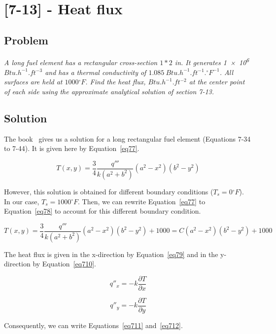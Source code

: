 \section{[7-13] - Heat flux}
\label{prob72}

\subsection{Problem}
\textit{A long fuel element has a rectangular cross-section $1*2$ in. It generates \num{1e6} $Btu.h^{-1}.ft^{-3}$ and has a thermal conductivity of $1.085\ Btu.h^{-1}.ft^{-1}.{}^\circ F^{-1}$. All surfaces are held at $1000{}^\circ F$. Find the heat flux, $Btu.h^{-1}.ft^{-2}$ at the center point of each side using the approximate analytical solution of section 7-13.}

\subsection{Solution}

The book~\cite{book01} gives us a solution for a long rectangular fuel element (Equations 7-34 to 7-44). It is given here by Equation~\ref{eq77}.

\begin{equation}\label{eq77}
T(x,y) = \frac{3}{4}\frac{q'''}{k(a^2+b^2)}(a^2-x^2)(b^2-y^2)
\end{equation}

However, this solution is obtained for different boundary conditions ($T_s = 0{}^\circ F$). In our case, $T_s = 1000{}^\circ F$. Then, we can rewrite Equation~\ref{eq77} to Equation~\ref{eq78} to account for this different boundary condition.


\begin{equation}\label{eq78}
T(x,y) = \frac{3}{4}\frac{q'''}{k(a^2+b^2)}(a^2-x^2)(b^2-y^2) + 1000 = C(a^2-x^2)(b^2-y^2) + 1000
\end{equation}

The heat flux is given in the x-direction by Equation~\ref{eq79} and in the y-direction by Equation~\ref{eq710}.


\begin{equation}\label{eq79}
q''_x = -k\frac{\partial T}{\partial x}
\end{equation}

\begin{equation}\label{eq710}
q''_y = -k\frac{\partial T}{\partial y}
\end{equation}

Consequently, we can write Equations~\ref{eq711} and~\ref{eq712}.

